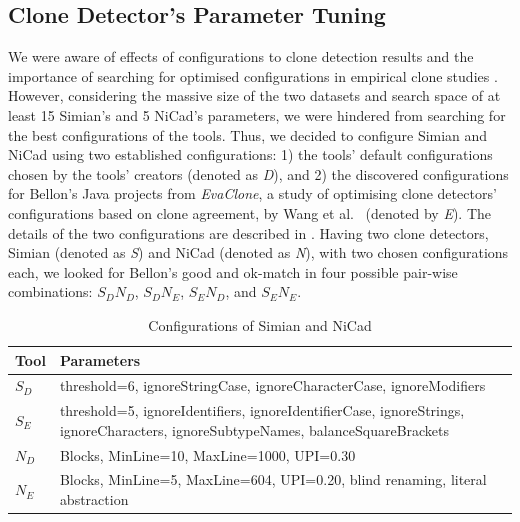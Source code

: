 \documentclass[sigconf,review, anonymous]{acmart}
\begin{document}
\subsection{Clone Detector's Parameter Tuning}
We were aware of effects of configurations to clone detection results and the importance of searching for optimised configurations in empirical clone studies \cite{Wang2014,cr2016ssbse,Ragkhitwetsagul2016,Svajlenko2014}. However, considering the massive size of the two datasets and search space of at least 15 Simian's and 5 NiCad's parameters, we were hindered from searching for the best configurations of the tools. Thus, we decided to configure Simian and NiCad using two established configurations: 1) the tools' default configurations chosen by the tools' creators (denoted as \textit{D}), and 2) the discovered configurations for Bellon's Java projects from \textit{EvaClone}, a study of optimising clone detectors' configurations based on clone agreement, by Wang et al.~\cite{Wang2013} (denoted by \textit{E}). The details of the two configurations are described in . Having two clone detectors, Simian (denoted as \textit{S}) and NiCad (denoted as \textit{N}), with two chosen configurations each, we looked for Bellon's good and ok-match in four possible pair-wise combinations: $S_{D}N_{D}$, $S_{D}N_{E}$, $S_{E}N_{D}$, and $S_{E}N_{E}$.

\begin{table}
	\centering
	\caption{Configurations of Simian and NiCad}
	\label{t:param_tuning}
	\small
	\begin{tabular}{l|p{7cm}}
		\hline 
		Tool & Parameters \\
		\hline
		$S_D$ &  threshold=6, ignoreStringCase, \newline ignoreCharacterCase, ignoreModifiers \\ 
		\hline
		$S_E$ & threshold=5, ignoreIdentifiers, \newline ignoreIdentifierCase, ignoreStrings, \newline ignoreCharacters, ignoreSubtypeNames, \newline balanceSquareBrackets  \\ 
		\hline 
		$N_D$ & Blocks, MinLine=10, MaxLine=1000, UPI=0.30 \\
		\hline
		$N_E$ & Blocks, MinLine=5, MaxLine=604, UPI=0.20, \newline blind renaming, literal abstraction \\ 
		\hline 
	\end{tabular} %
\end{table}
\end{document}
